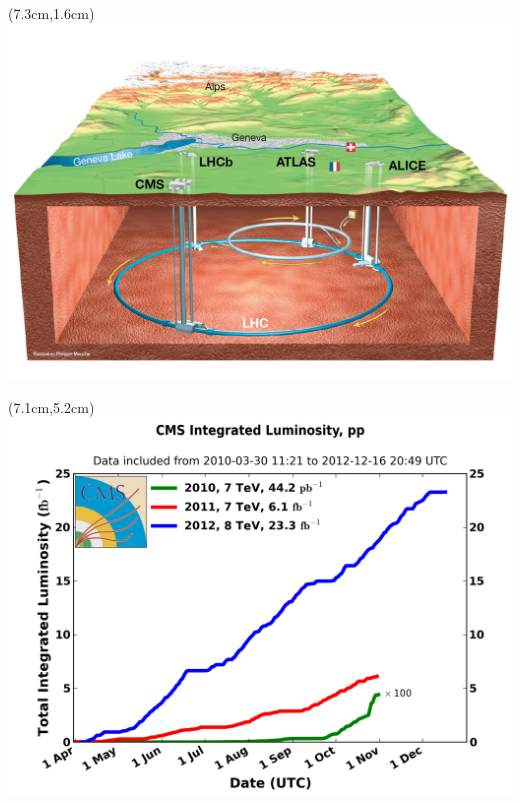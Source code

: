 \documentclass[compress, serif]{beamer}
\begin{document}
{\begin{textblock*}{5cm}(7.3cm,1.6cm) %
\includegraphics[width=.4\paperwidth,]{../figures/CERN_hiRes.png}
\end{textblock*}
\begin{textblock*}{5cm}(7.1cm,5.2cm) %
\includegraphics[width=.45\paperwidth,]{../figures/int_lumi_cumulative_pp_2.png}
\end{textblock*}
}
\end{document}
